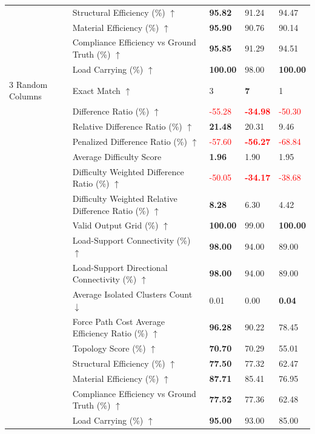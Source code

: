 \begin{table}[!h]
{\begin{tabular}{lllll}
 & Structural Efficiency (\%) $\uparrow$ & \textbf{95.82} & 91.24 & 94.47 \\
 & Material Efficiency (\%) $\uparrow$ & \textbf{95.90} & 90.76 & 90.14 \\
 & Compliance Efficiency vs Ground Truth (\%) $\uparrow$ & \textbf{95.85} & 91.29 & 94.51 \\
 & Load Carrying (\%) $\uparrow$ & \textbf{100.00} & 98.00 & \textbf{100.00} \\
3 Random Columns & Exact Match $\uparrow$ & 3 & \textbf{7} & 1 \\
 & Difference Ratio (\%) $\uparrow$ & \textcolor{red}{-55.28} & \textbf{\textcolor{red}{-34.98}} & \textcolor{red}{-50.30} \\
 & Relative Difference Ratio (\%) $\uparrow$ & \textbf{21.48} & 20.31 & 9.46 \\
 & Penalized Difference Ratio (\%) $\uparrow$ & \textcolor{red}{-57.60} & \textbf{\textcolor{red}{-56.27}} & \textcolor{red}{-68.84} \\
 & Average Difficulty Score & \textbf{1.96} & 1.90 & 1.95 \\
 & Difficulty Weighted Difference Ratio (\%) $\uparrow$ & \textcolor{red}{-50.05} & \textbf{\textcolor{red}{-34.17}} & \textcolor{red}{-38.68} \\
 & Difficulty Weighted Relative Difference Ratio (\%) $\uparrow$ & \textbf{8.28} & 6.30 & 4.42 \\
 & Valid Output Grid (\%) $\uparrow$ & \textbf{100.00} & 99.00 & \textbf{100.00} \\
 & Load-Support Connectivity (\%) $\uparrow$ & \textbf{98.00} & 94.00 & 89.00 \\
 & Load-Support Directional Connectivity (\%) $\uparrow$ & \textbf{98.00} & 94.00 & 89.00 \\
 & Average Isolated Clusters Count $\downarrow$ & 0.01 & 0.00 & \textbf{0.04} \\
 & Force Path Cost Average Efficiency Ratio (\%) $\uparrow$ & \textbf{96.28} & 90.22 & 78.45 \\
 & Topology Score (\%) $\uparrow$ & \textbf{70.70} & 70.29 & 55.01 \\
 & Structural Efficiency (\%) $\uparrow$ & \textbf{77.50} & 77.32 & 62.47 \\
 & Material Efficiency (\%) $\uparrow$ & \textbf{87.71} & 85.41 & 76.95 \\
 & Compliance Efficiency vs Ground Truth (\%) $\uparrow$ & \textbf{77.52} & 77.36 & 62.48 \\
 & Load Carrying (\%) $\uparrow$ & \textbf{95.00} & 93.00 & 85.00 \\

\end{tabular}}
\end{table}
